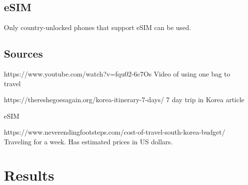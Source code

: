 \documentclass[12pt]{report} %
\begin{document}
\section*{eSIM}
Only country-unlocked phones that support eSIM can be used.
\section{Sources}

https://www.youtube.com/watch?v=fqu02-6c7Os
Video of using one bag to travel

https://thereshegoesagain.org/korea-itinerary-7-days/
7 day trip in Korea article


eSIM

https://www.neverendingfootsteps.com/cost-of-travel-south-korea-budget/
Traveling for a week. Has estimated prices in US dollars.
\chapter{Results} 
\end{document}
